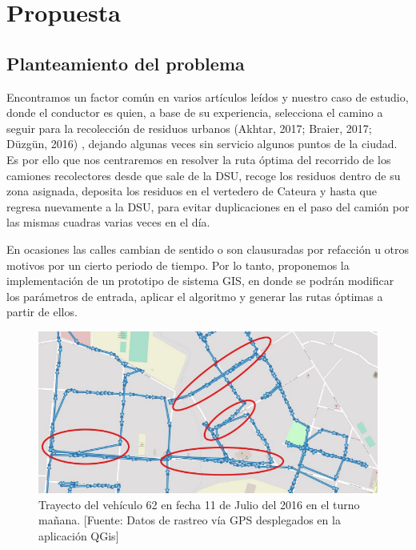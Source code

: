 \chapter{Propuesta}
\label{chap5}
\ifpdf
  \graphicspath{{Chapter5/Chapter5Figs/PNG/}{Chapter5/Chapter5Figs/PDF/}{Chapter5/Chapter5Figs/}}
\else
  \graphicspath{{Chapter5/Chapter5Figs/EPS/}{Chapter5/Chapter5Figs/}}
\fi


\section{Planteamiento del problema}
\label{sec:planteamiento}

Encontramos un factor común en varios artículos leídos y nuestro caso de estudio, donde el conductor es quien, a base de su experiencia, selecciona el camino a seguir para la recolección de residuos urbanos (Akhtar, 2017; Braier, 2017; Düzgün, 2016) \citet{Akhtar2017BacktrackingOptimization, Braier2017AnArgentina, Duzgun2016ParallelRouting}, dejando algunas veces sin servicio algunos puntos de la ciudad. Es por ello que nos centraremos en resolver la ruta óptima del recorrido de los camiones recolectores desde que sale de la DSU, recoge los residuos dentro de su zona asignada, deposita los residuos en el vertedero de Cateura y hasta que regresa nuevamente a la DSU, para evitar duplicaciones en el paso del camión por las mismas cuadras varias veces en el día.

En ocasiones las calles cambian de sentido o son clausuradas por refacción u otros motivos por un cierto periodo de tiempo. Por lo tanto, proponemos la implementación de un prototipo de sistema GIS, en donde se podrán modificar los parámetros de entrada, aplicar el algoritmo y generar las rutas óptimas a partir de ellos.

\begin{figure}[H]
    \centering
    \includegraphics[width=14.5cm]{20170329_recorrido_repetido.png}
    \caption{Trayecto del vehículo 62 en fecha 11 de Julio del 2016 en el turno mañana. [Fuente: Datos de rastreo vía GPS desplegados en la aplicación QGis]}
    \label{fig:trayectoRecoleccion}
\end{figure}

